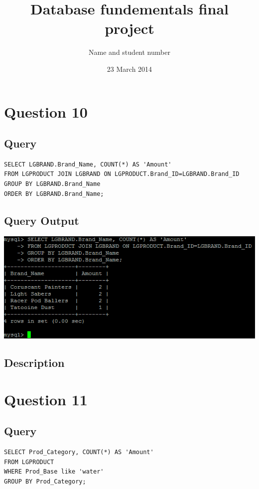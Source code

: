 \documentclass[a4paper,10pt]{article}
\title{Database fundementals final project}
\author{Name and student number}
\date{23 March 2014}
\begin{document}
\begin{titlepage}
\maketitle
\end{titlepage}
\tableofcontents{}
\newpage
\thispagestyle{empty}
\mbox{}
\section*{Question 10}
 \subsection{Query}
          \lstset{
            language=SQL,
            breaklines=true
            }
        \begin{lstlisting}[frame=single]
        SELECT LGBRAND.Brand_Name, COUNT(*) AS 'Amount'
FROM LGPRODUCT JOIN LGBRAND ON LGPRODUCT.Brand_ID=LGBRAND.Brand_ID
GROUP BY LGBRAND.Brand_Name
ORDER BY LGBRAND.Brand_Name;

        \end{lstlisting}
\subsection{Query Output}
           \includegraphics{Queries/Question_10/Question_10_screenshot.PNG}
\subsection{Description}
\section*{Question 11}
 \subsection{Query}
          \lstset{
            language=SQL,
            breaklines=true
            }
        \begin{lstlisting}[frame=single]
        SELECT Prod_Category, COUNT(*) AS 'Amount'
FROM LGPRODUCT
WHERE Prod_Base like 'water'
GROUP BY Prod_Category;

        \end{lstlisting}
\end{document}
